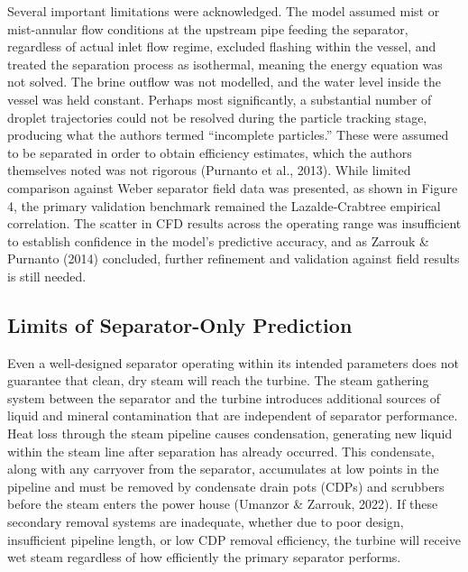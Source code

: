 Several important limitations were acknowledged. The model assumed mist or mist-annular flow conditions at the upstream pipe feeding the separator, regardless of actual inlet flow regime, excluded flashing within the vessel, and treated the separation process as isothermal, meaning the energy equation was not solved. The brine outflow was not modelled, and the water level inside the vessel was held constant. Perhaps most significantly, a substantial number of droplet trajectories could not be resolved during the particle tracking stage, producing what the authors termed ``incomplete particles.'' These were assumed to be separated in order to obtain efficiency estimates, which the authors themselves noted was not rigorous (Purnanto et al., 2013). While limited comparison against Weber separator field data was presented, as shown in Figure 4, the primary validation benchmark remained the Lazalde-Crabtree empirical correlation. The scatter in CFD results across the operating range was insufficient to establish confidence in the model's predictive accuracy, and as Zarrouk \& Purnanto (2014) concluded, further refinement and validation against field results is still needed.

\subsection{Limits of Separator-Only Prediction}

Even a well-designed separator operating within its intended parameters does not guarantee that clean, dry steam will reach the turbine. The steam gathering system between the separator and the turbine introduces additional sources of liquid and mineral contamination that are independent of separator performance. Heat loss through the steam pipeline causes condensation, generating new liquid within the steam line after separation has already occurred. This condensate, along with any carryover from the separator, accumulates at low points in the pipeline and must be removed by condensate drain pots (CDPs) and scrubbers before the steam enters the power house (Umanzor \& Zarrouk, 2022). If these secondary removal systems are inadequate, whether due to poor design, insufficient pipeline length, or low CDP removal efficiency, the turbine will receive wet steam regardless of how efficiently the primary separator performs.

